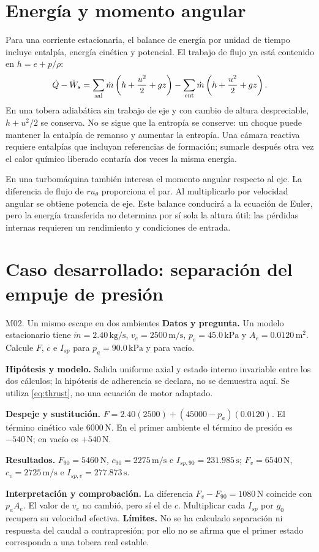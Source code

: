 \section{Energía y momento angular}
Para una corriente estacionaria, el balance de energía por unidad de tiempo incluye entalpía, energía cinética y potencial. El trabajo de flujo ya está contenido en $h=e+p/\rho$:
\begin{equation}
 \dot Q-\dot W_s=\sum_{\rm sal}\dot m\left(h+\frac{u^2}{2}+gz\right)
 -\sum_{\rm ent}\dot m\left(h+\frac{u^2}{2}+gz\right).
\end{equation}
En una tobera adiabática sin trabajo de eje y con cambio de altura despreciable, $h+u^2/2$ se conserva. No se sigue que la entropía se conserve: un choque puede mantener la entalpía de remanso y aumentar la entropía. Una cámara reactiva requiere entalpías que incluyan referencias de formación; sumarle después otra vez el calor químico liberado contaría dos veces la misma energía.

En una turbomáquina también interesa el momento angular respecto al eje. La diferencia de flujo de $r u_\theta$ proporciona el par. Al multiplicarlo por velocidad angular se obtiene potencia de eje. Este balance conducirá a la ecuación de Euler, pero la energía transferida no determina por sí sola la altura útil: las pérdidas internas requieren un rendimiento y condiciones de entrada.
\section{Caso desarrollado: separación del empuje de presión}
\begin{studiumworked}{M02. Un mismo escape en dos ambientes}
\textbf{Datos y pregunta.} Un modelo estacionario tiene $\dot m=2.40\,\mathrm{kg/s}$, $v_e=2500\,\mathrm{m/s}$, $p_e=45.0\,\mathrm{kPa}$ y $A_e=0.0120\,\mathrm{m^2}$. Calcule $F$, $c$ e $I_{sp}$ para $p_a=90.0\,\mathrm{kPa}$ y para vacío.

\textbf{Hipótesis y modelo.} Salida uniforme axial y estado interno invariable entre los dos cálculos; la hipótesis de adherencia se declara, no se demuestra aquí. Se utiliza \eqref{eq:thrust}, no una ecuación de motor adaptado.

\textbf{Despeje y sustitución.} $F=2.40(2500)+(45000-p_a)(0.0120)$. El término cinético vale $6000\,\mathrm N$. En el primer ambiente el término de presión es $-540\,\mathrm N$; en vacío es $+540\,\mathrm N$.

\textbf{Resultados.} $F_{90}=5460\,\mathrm N$, $c_{90}=2275\,\mathrm{m/s}$ e $I_{sp,90}=231.985\,\mathrm s$; $F_v=6540\,\mathrm N$, $c_v=2725\,\mathrm{m/s}$ e $I_{sp,v}=277.873\,\mathrm s$.

\textbf{Interpretación y comprobación.} La diferencia $F_v-F_{90}=1080\,\mathrm N$ coincide con $p_aA_e$. El valor de $v_e$ no cambió, pero sí el de $c$. Multiplicar cada $I_{sp}$ por $g_0$ recupera su velocidad efectiva. \textbf{Límites.} No se ha calculado separación ni respuesta del caudal a contrapresión; por ello no se afirma que el primer estado corresponda a una tobera real estable.
\end{studiumworked}

